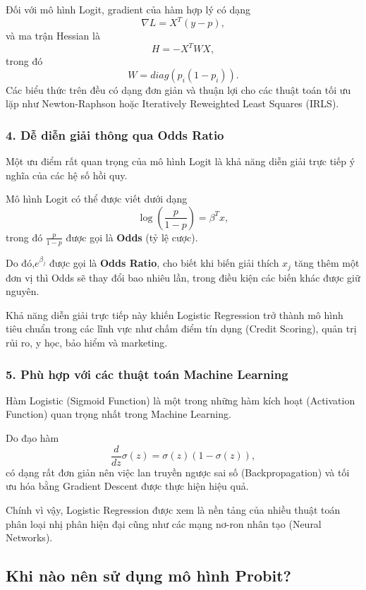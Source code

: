 Đối với mô hình Logit, gradient của hàm hợp lý có dạng
\[
\nabla L
=
X^{T}(y-p),
\]
và ma trận Hessian là
\[
H
=
-X^{T}WX,
\]
trong đó
\[
W
=
diag\left(p_i(1-p_i)\right).
\]
Các biểu thức trên đều có dạng đơn giản và thuận lợi cho các thuật toán tối ưu lặp như Newton-Raphson hoặc Iteratively Reweighted Least Squares (IRLS).


\subsubsection{4. Dễ diễn giải thông qua Odds Ratio}
Một ưu điểm rất quan trọng của mô hình Logit là khả năng diễn giải trực tiếp ý nghĩa của các hệ số hồi quy.

Mô hình Logit có thể được viết dưới dạng
\[
\boxed{
\log
\left(
\frac{p}{1-p}
\right)
=
\beta^{T}x,
}
\]
trong đó
$
\frac{p}{1-p}
$
được gọi là \textbf{Odds} (tỷ lệ cược).

Do đó,$e^{\beta_j}$
được gọi là \textbf{Odds Ratio}, cho biết khi biến giải thích $x_j$ tăng thêm một đơn vị thì Odds sẽ thay đổi bao nhiêu lần, trong điều kiện các biến khác được giữ nguyên.

Khả năng diễn giải trực tiếp này khiến Logistic Regression trở thành mô hình tiêu chuẩn trong các lĩnh vực như chấm điểm tín dụng (Credit Scoring), quản trị rủi ro, y học, bảo hiểm và marketing.


\subsubsection{5. Phù hợp với các thuật toán Machine Learning}
Hàm Logistic (Sigmoid Function) là một trong những hàm kích hoạt (Activation Function) quan trọng nhất trong Machine Learning.

Do đạo hàm
\[
\frac{d}{dz}\sigma(z)
=
\sigma(z)(1-\sigma(z)),
\]
có dạng rất đơn giản nên việc lan truyền ngược sai số (Backpropagation) và tối ưu hóa bằng Gradient Descent được thực hiện hiệu quả.

Chính vì vậy, Logistic Regression được xem là nền tảng của nhiều thuật toán phân loại nhị phân hiện đại cũng như các mạng nơ-ron nhân tạo (Neural Networks).


\subsection*{Khi nào nên sử dụng mô hình Probit?}

